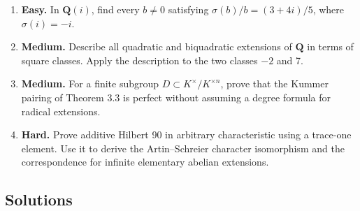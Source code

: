 \documentclass[11pt,a4paper]{article}
\newcommand{\tightlist}{\setlength{\itemsep}{0pt}\setlength{\parskip}{0pt}}
\begin{document}
\begin{enumerate}
\def\labelenumi{\arabic{enumi}.}
\tightlist
\item
  \textbf{Easy.} In \(\mathbf Q(i)\), find every \(b\ne0\) satisfying
  \(\sigma(b)/b=(3+4i)/5\), where \(\sigma(i)=-i\).
\item
  \textbf{Medium.} Describe all quadratic and biquadratic extensions of
  \(\mathbf Q\) in terms of square classes. Apply the description to the
  two classes \(-2\) and 7.
\item
  \textbf{Medium.} For a finite subgroup
  \(D\subset K^\times/K^{\times n}\), prove that the Kummer pairing of
  Theorem 3.3 is perfect without assuming a degree formula for radical
  extensions.
\item
  \textbf{Hard.} Prove additive Hilbert 90 in arbitrary characteristic
  using a trace-one element. Use it to derive the Artin--Schreier
  character isomorphism and the correspondence for infinite elementary
  abelian extensions.
\end{enumerate}

\subsection{Solutions}\label{solutions}
\end{document}
